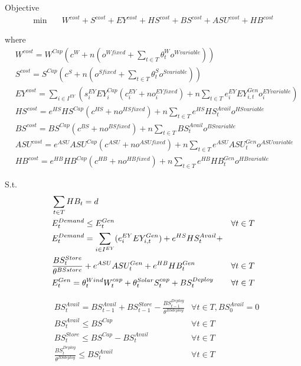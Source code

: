 \documentclass[12 pt]{article}
\begin{document}
Objective
\begin{align}
\min \quad
& W^{cost} + S^{cost} + EY^{cost} + HS^{cost} + BS^{cost} + ASU^{cost} + HB^{cost}
\end{align}




where
\begin{align}
& W^{cost} = W^{Cap}(c^{W} + n (o^{W fixed} + \sum_{t \in T}\theta^{W}_{t}o^{W variable}))\\
& S^{cost} = S^{Cap}(c^{S} + n (o^{S fixed}  + \sum_{t \in T}\theta^{S}_{t}o^{S variable}))\\
& EY^{cost} = \sum_{i \in I^{EY}}(s^{EY}_{i}EY^{Cap}_{i}(c^{EY}_{i} + no^{EY fixed}_{i})  + n\sum_{t \in T}e^{EY}_{i}EY^{Gen}_{i,t}o^{EY variable}_{i})\\
& HS^{cost} = e^{HS}HS^{Cap}(c^{HS} + no^{HS fixed})  + n\sum_{t \in T}e^{HS}HS^{Avail}_{t}o^{HS variable}\\
& BS^{cost} = BS^{Cap}(c^{BS} + no^{BS fixed})  + n\sum_{t \in T}BS^{Avail}_{t}o^{BS variable}\\
& ASU^{cost} = e^{ASU}ASU^{Cap}(c^{ASU} + no^{ASU fixed}) + n\sum_{t \in T}e^{ASU}ASU^{Gen}_{t}o^{ASU variable}\\
& HB^{cost} = e^{HB}HB^{Cap}(c^{HB} + no^{HB fixed}) + n\sum_{t \in T}e^{HB}HB^{Gen}_{t}o^{HB variable}
\end{align}

S.t.
\begin{align}
& \sum_{t\in T}HB_{t} = d \\
& E^{Demand}_{t} \leq E^{Gen}_t & \forall t \in T \\
& E^{Demand}_{t} = \sum_{i \in I^{EY}}(e^{EY}_{i}EY^{Gen}_{i,t}) + e^{HS}HS^{Avail}_{t} + \notag\\
& \frac{BS^{Store}_{t}}{\theta^{BSstore}} + e^{ASU}ASU^{Gen}_{t} + e^{HB}HB^{Gen}_{t} &\forall t \in T \\
& E^{Gen}_{t} = \theta^{Wind}_{t}W^{cap}_{t} + \theta^{Solar}_{t}S^{cap}_{t} + BS^{Deploy}_{t} & \forall t \in T
\end{align}


\begin{align}
& BS^{Avail}_{t} = BS^{Avail}_{t-1} + BS^{Store}_{t-1} - \frac{BS^{Deploy}_{t-1}}{\theta^{BSdeploy}} & \forall t \in T,BS^{Avail}_{0} = 0 \\
& BS^{Avail}_{t} \leq BS^{Cap} & \forall t \in T \\
& BS^{Store}_{t} \leq BS^{Cap}-BS^{Avail}_{t} & \forall t \in T \\
&  \frac{BS^{Deploy}_{t}}{\theta^{BSdeploy}} \leq BS^{Avail}_{t} & \forall t \in T
\end{align}
\end{document}
